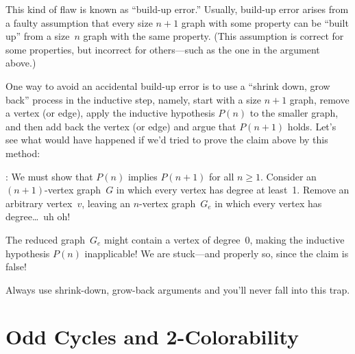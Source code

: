 This kind of flaw is known as ``build-up error.''  Usually, build-up
error arises from a faulty assumption that every size $n + 1$ graph
with some property can be ``built up'' from a size~$n$ graph with the
same property.  (This assumption is correct for some properties, but
incorrect for others---such as the one in the argument above.)

One way to avoid an accidental build-up error is to use a ``shrink
down, grow back'' process in the inductive step, namely, start with a
size $n+1$ graph, remove a vertex (or edge), apply the inductive
hypothesis $P(n)$ to the smaller graph, and then add back the vertex
(or edge) and argue that $P(n + 1)$ holds.  Let's see what would have
happened if we'd tried to prove the claim above by this method:

: We must show that $P(n)$
implies $P(n + 1)$ for all $n \ge 1$.  Consider an $(n + 1)$-vertex
graph~$G$ in which every vertex has degree at least~1.  Remove an
arbitrary vertex~$v$, leaving an $n$-vertex graph~$G_e$ in which every
vertex has degree\dots\ uh oh!

The reduced graph~$G_e$ might contain a vertex of degree~0, making the
inductive hypothesis $P(n)$ inapplicable!  We are stuck---and
properly so, since the claim is false!

Always use shrink-down, grow-back arguments and you'll never fall into
this trap.


\fi

\begin{problems}
\classproblems
{}

\homeworkproblems
{}


\homeworkproblems
{}

\examproblems
{}

\end{problems}

\section{Odd Cycles and 2-Colorability}\label{subsec:odd_cycles}

